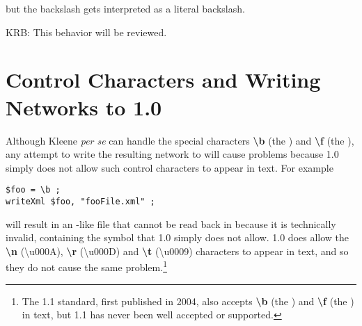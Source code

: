 \noindent

\noindent
but the backslash gets interpreted as a literal backslash.  

KRB:  This
behavior will be reviewed.

\section{Control Characters and Writing Networks to  1.0}

Although Kleene \emph{per se} can handle the special characters
\textbf{\textbackslash{}b} (the ) and
\textbf{\textbackslash{}f} (the ), any attempt to write
the resulting network to  will cause problems because
 1.0 simply does not allow such control characters to appear in
 text.  For example

\begin{Verbatim}[fontsize=\small]
$foo = \b ;
writeXml $foo, "fooFile.xml" ;
\end{Verbatim}

\noindent
will result in an -like file that cannot be read back in
because it is technically invalid, containing the  symbol
that  1.0 simply does not allow.   1.0 does allow the
\textbf{\textbackslash{}n} (\textbackslash{}u000A),
\textbf{\textbackslash{}r} (\textbackslash{}u000D) and
\textbf{\textbackslash{}t} (\textbackslash{}u0009) characters to appear
in text, and so they do not cause the same problem.\footnote{The
 1.1 standard, first published in 2004, also accepts
\textbf{\textbackslash{}b} (the ) and
\textbf{\textbackslash{}f} (the ) in  text, but
 1.1 has never been well accepted or supported.}


